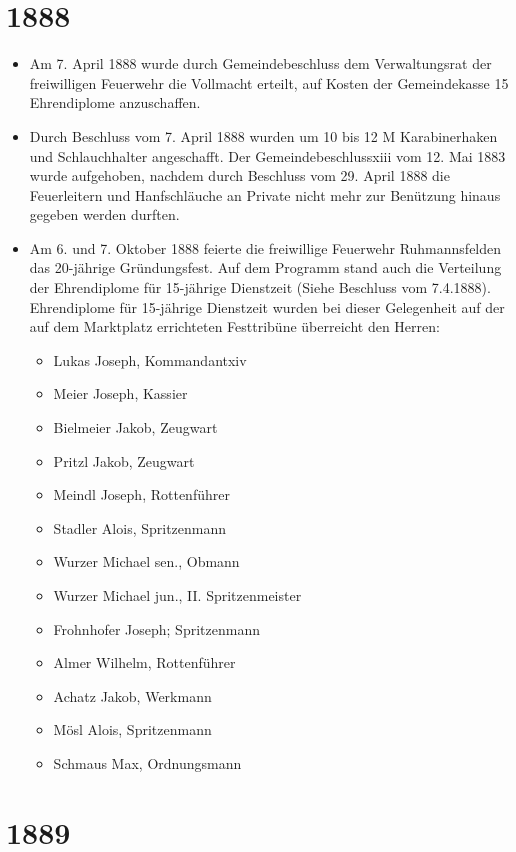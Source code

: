 \documentclass[12pt,a4paper]{book}
\begin{document}
\section*{1888}

\begin{itemize}
\item Am 7. April 1888 wurde durch Gemeindebeschluss dem Verwaltungsrat der
freiwilligen Feuerwehr die Vollmacht erteilt, auf Kosten der Gemeindekasse 15
Ehrendiplome anzuschaffen.

\item Durch Beschluss vom 7. April 1888 wurden um 10 bis 12 M Karabinerhaken und
Schlauchhalter angeschafft. Der Gemeindebeschlussxiii vom 12. Mai 1883 wurde
aufgehoben, nachdem durch Beschluss vom 29. April 1888 die Feuerleitern und
Hanfschläuche an Private nicht mehr zur Benützung hinaus gegeben werden durften.

\item Am 6. und 7. Oktober 1888 feierte die freiwillige Feuerwehr Ruhmannsfelden
das 20-jährige Gründungsfest. Auf dem Programm stand auch die Verteilung der
Ehrendiplome für 15-jährige Dienstzeit (Siehe Beschluss vom 7.4.1888).
Ehrendiplome für 15-jährige Dienstzeit wurden bei dieser Gelegenheit auf der auf
dem Marktplatz errichteten Festtribüne überreicht den Herren:

\begin{itemize}
\item Lukas Joseph, Kommandantxiv
\item Meier Joseph, Kassier
\item Bielmeier Jakob, Zeugwart
\item Pritzl Jakob, Zeugwart
\item Meindl Joseph, Rottenführer
\item Stadler Alois, Spritzenmann
\item Wurzer Michael sen., Obmann
\item Wurzer Michael jun., II. Spritzenmeister
\item Frohnhofer Joseph; Spritzenmann
\item Almer Wilhelm, Rottenführer
\item Achatz Jakob, Werkmann
\item Mösl Alois, Spritzenmann
\item Schmaus Max, Ordnungsmann
\end{itemize}
\end{itemize}

\section*{1889}
\end{document}
